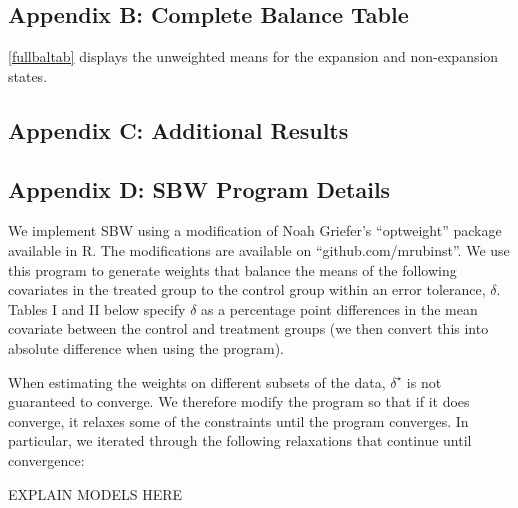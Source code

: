 \documentclass[12pt]{article}
\begin{document}
\subsection{Appendix B: Complete Balance Table}

\ref{fullbaltab} displays the unweighted means for the expansion and non-expansion states. 


\subsection{Appendix C: Additional Results}

\subsection{Appendix D: SBW Program Details}

We implement SBW using a modification of Noah Griefer's ``optweight'' package available in R. The modifications are available on ``github.com/mrubinst''. We use this program to generate weights that balance the means of the following covariates in the treated group to the control group within an error tolerance, $\delta$. Tables I and II below specify $\delta$ as a percentage point differences in the mean covariate between the control and treatment groups (we then convert this into absolute difference when using the program). 

When estimating the weights on different subsets of the data, $\delta^\star$ is not guaranteed to converge. We therefore modify the program so that if it does converge, it relaxes some of the constraints until the program converges. In particular, we iterated through the  following relaxations that continue until convergence:

EXPLAIN MODELS HERE
\end{document}
